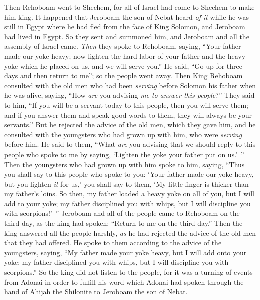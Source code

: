 \begin{biblechapter} %
 Then Rehoboam went to Shechem, for all of Israel had come to Shechem to make him king.
\verse It happened that Jeroboam the son of Nebat heard \textit{of it} while he was still in Egypt where he had fled from the face of King Solomon, and Jeroboam had lived in Egypt.
\verse So they sent and summoned him, and Jeroboam and all the assembly of Israel came. \textit{Then} they spoke to Rehoboam, saying,
\verse “Your father made our yoke heavy; now lighten the hard labor of your father and the heavy yoke which he placed on us, and we will serve you.”
\verse He said, “Go up for three days and then return to me”; so the people went away.
 Then King Rehoboam consulted with the old men who had been \textit{serving} before Solomon his father when he was alive, saying, “How \textit{are} you advising \textit{me} \textit{to answer this people}?”
\verse They said to him, “If you will be a servant today to this people, then you will serve them; and if you answer them and speak good words to them, they will always be your servants.”
\verse But he rejected the advice of the old men, which they gave him, and he consulted with the youngsters who had grown up with him, who were \textit{serving} before him.
\verse He said to them, “What \textit{are} you advising that we should reply to this people who spoke to me by saying, ‘Lighten the yoke your father put on us.’ ”
\verse Then the youngsters who had grown up with him spoke to him, saying, “Thus you shall say to this people who spoke to you: ‘Your father made our yoke heavy, but you lighten \textit{it} for us,’ you shall say to them, ‘My little finger is thicker than my father’s loins.
\verse So then, my father loaded a heavy yoke on all of you, but I will add to your yoke; my father disciplined you with whips, but I will discipline you with scorpions!’ ”
 Jeroboam and all of the people came to Rehoboam on the third day, as the king had spoken: “Return to me on the third day.”
\verse Then the king answered all the people harshly, \textit{as} he had rejected the advice of the old men that they had offered.
\verse He spoke to them according to the advice of the youngsters, saying, “My father made your yoke heavy, but I will add onto your yoke; my father disciplined you with whips, but I will discipline you with scorpions.”
\verse So the king did not listen to the people, for it was a turning of events from Adonai in order to fulfill his word which Adonai had spoken through the hand of Ahijah the Shilonite to Jeroboam the son of Nebat.

\end{biblechapter}
